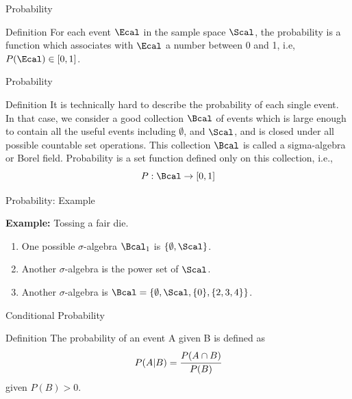 \documentclass[aspectratio=169,xcolor=dvipsnames,svgnames,x11names,fleqn]{beamer}
\begin{document}
    \begin{frame}[containsverbatim]{Probability}
    \begin{tblock}{Definition}
       For each event $\Ecal$ in the sample space $\Scal$, the probability is a function which associates with $\Ecal$ a number between 0 and 1, i.e, $P(\Ecal) \in [ 0, 1]$.
    \end{tblock}
    \end{frame}
    
    
    \begin{frame}[containsverbatim]{Probability}
        \begin{tblock}{Definition}
        It is technically hard to describe the probability of each single event. In that case, we consider a good collection $\Bcal$ of events which is large enough to contain all the useful events including $\emptyset$, and $\Scal$, and is closed under all possible countable set operations. This collection $\Bcal$ is called a sigma-algebra or Borel field. Probability is a set function defined only on this collection, i.e.,
        $$
        P: \Bcal \rightarrow [0, 1]
        $$
        
        \end{tblock}
    \end{frame}

    \begin{frame}{Probability: Example}

        \textbf{Example:} Tossing a fair die.
    
       \begin{enumerate}
           \item One possible $\sigma$-algebra $\Bcal_1$ is $\{ \emptyset, \Scal\}$.
           \item Another $\sigma$-algebra is the power set of $\Scal$.
           \item Another $\sigma$-algebra is $\Bcal = \{\emptyset, \Scal, \{0\}, \{2, 3, 4\}\}$.
       \end{enumerate}
        
    \end{frame}
    
    
    \begin{frame}[containsverbatim]{Conditional Probability}
        \begin{tblock}{Definition}
            The probability of an event A given B is defined as
            \begin{equation}
                P(A|B) = \cfrac{P(A \cap B )}{P(B)}
            \end{equation}
            given $P(B) > 0$.
        \end{tblock}
    \end{frame}
\end{document}
